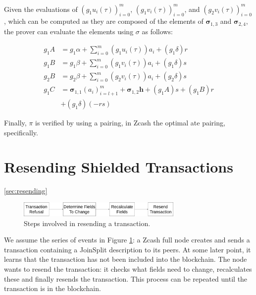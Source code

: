 \documentclass{article}
\begin{document}
Given the evaluations of $(g_1{u_i(\tau)})_{i=0}^m$, $(g_1{v_i(\tau)})_{i=0}^m$, and $(g_2{v_i(\tau)})_{i=0}^m$, which can be computed as they are composed of the elements of $\boldsymbol\sigma_{1,3}$ and $\boldsymbol\sigma_{2,4}$, the prover can evaluate the elements using $\sigma$ as follows:

\begin{align}
        g_1A &= g_1\alpha + \sum_{i=0}^m {(g_1{u_i(\tau)})}{a_i} + {(g_1{\delta})}r \label{eq:gA} \\
        g_1B &= g_1\beta + \sum_{i=0}^m {(g_1{v_i(\tau)})}{a_i} + {(g_1{\delta})}s \label{eq:g1B} \\
        g_2B &= g_2\beta + \sum_{i=0}^m {(g_2{v_i(\tau)})}{a_i} + {(g_2{\delta})}s \label{eq:g2B} \\
        g_1C &= \boldsymbol\sigma_{1,1}(a_i)_{i=l+1}^m + \boldsymbol\sigma_{1,2}\boldsymbol{h} + {(g_1A)}s + {(g_1B)}r \nonumber \\
        &+ {(g_1\delta)}{(-rs)} \label{eq:gC} 
\end{align}

Finally, $\pi$ is verified by using a pairing, in Zcash the optimal ate pairing\cite{vercauteren:optimal-ate}, specifically.

\section{Resending Shielded Transactions} \ref{sec:resending}

\begin{figure}[t]
\includegraphics[width=8cm]{images/timeline.png}
\caption{Steps involved in resending a transaction.} \label{fig:resend-steps}
\centering
\end{figure}

We assume the series of events in Figure \ref{fig:resend-steps}: a Zcash full node creates and sends a transaction containing a JoinSplit description to its peers.
At some later point, it learns that the transaction has not been included into the blockchain.
The node wants to resend the transaction: it checks what fields need to change, recalculates these and finally resends the transaction.
This process can be repeated until the transaction is in the blockchain.
\end{document}
